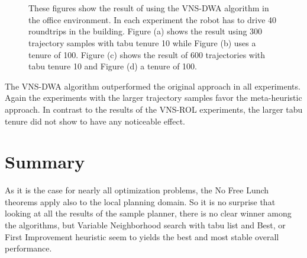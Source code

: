 \begin{figure}[thpb]
   \myfloatalign
    \tiny
    \centering
    
    \\
    \\
    {
    \captionsetup[subfigure]{labelformat=empty} 
    }


    \caption[Experiment: VNS-DWA office]{These figures show the result of using the VNS-DWA algorithm in the office environment. In each experiment the robot has to drive 40 roundtrips in the building. Figure (a) shows the result using 300 trajectory samples with tabu tenure 10 while Figure (b) uses a tenure of 100. Figure (c) shows the result of 600 trajectories with tabu tenure 10 and Figure (d) a tenure of 100.}  
     \label{fig:fig_gh25_dwa}
\end{figure} 

The VNS-DWA algorithm outperformed the original approach in all experiments.
Again the experiments with the larger trajectory samples favor the meta-heuristic approach.
In contrast to the results of the VNS-ROL experiments, the larger tabu tenure did not show to have any noticeable effect.

\section{Summary}
As it is the case for nearly all optimization problems, the No Free Lunch theorems \cite{wolpert1997no} apply also to the local planning domain. 
So it is no surprise that looking at all the results of the sample planner, there is no clear winner among the algorithms, but Variable Neighborhood search with tabu list and Best, or First Improvement heuristic seem to yields the best and most stable overall performance. 

